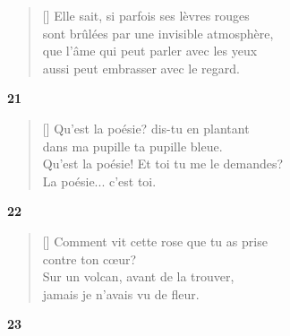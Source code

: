 \documentclass[a4paper,12pt]{book}
\begin{document}
\settowidth{\versewidth}{sont brûlées par une invisible atmosphère,}

\begin{verse}[\versewidth]
  Elle sait, si parfois ses lèvres rouges \\
  sont brûlées par une invisible atmosphère, \\
  que l'âme qui peut parler avec les yeux \\
  aussi peut embrasser avec le regard.
\end{verse}

\bigskip

\begin{center}
  \textbf{21}
\end{center}

\settowidth{\versewidth}{Qu'est la poésie! Et toi tu me le demandes?}

\begin{verse}[\versewidth]
  Qu'est la poésie? dis-tu en plantant \\
  dans ma pupille ta pupille bleue. \\
  Qu'est la poésie! Et toi tu me le demandes? \\
  La poésie... c'est toi.
\end{verse}

\bigskip

\begin{center}
  \textbf{22}
\end{center}

\settowidth{\versewidth}{Comment vit cette rose que tu as prise}

\begin{verse}[\versewidth]
  Comment vit cette rose que tu as prise \\
  contre ton cœur? \\
  Sur un volcan, avant de la trouver, \\
  jamais je n'avais vu de fleur.
\end{verse}

\bigskip

\begin{center}
  \textbf{23}
\end{center}

\settowidth{\versewidth}{que t'offrir pour un baiser!}
\end{document}

